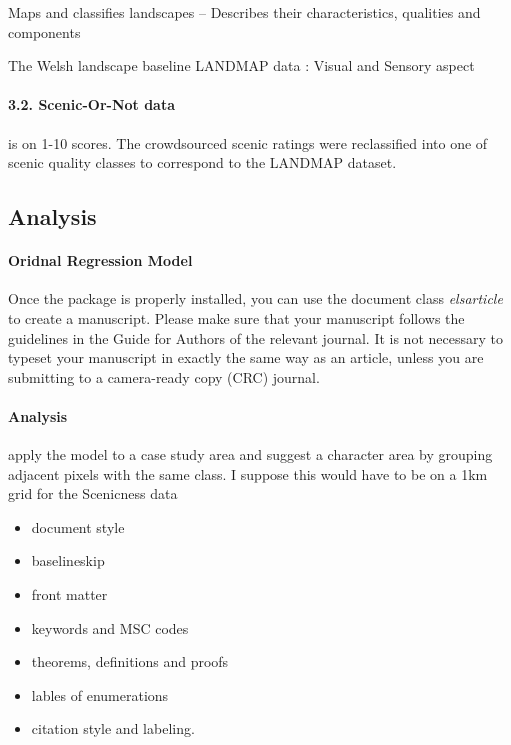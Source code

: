\documentclass[]{elsarticle} %
\begin{document}
Maps and classifies landscapes -- Describes their characteristics,
qualities and components

The Welsh landscape baseline LANDMAP data : Visual and Sensory aspect

\hypertarget{scenic-or-not-data}{%
\paragraph{3.2. Scenic-Or-Not data}\label{scenic-or-not-data}}

is on 1-10 scores. The crowdsourced scenic ratings were reclassified
into one of scenic quality classes to correspond to the LANDMAP dataset.

\hypertarget{analysis}{%
\subsection{Analysis}\label{analysis}}

\hypertarget{oridnal-regression-model}{%
\paragraph{Oridnal Regression Model}\label{oridnal-regression-model}}

Once the package is properly installed, you can use the document class
\emph{elsarticle} to create a manuscript. Please make sure that your
manuscript follows the guidelines in the Guide for Authors of the
relevant journal. It is not necessary to typeset your manuscript in
exactly the same way as an article, unless you are submitting to a
camera-ready copy (CRC) journal.

\hypertarget{analysis-1}{%
\paragraph{Analysis}\label{analysis-1}}

apply the model to a case study area and suggest a character area by
grouping adjacent pixels with the same class. I suppose this would have
to be on a 1km grid for the Scenicness data

\begin{itemize}
\item
  document style
\item
  baselineskip
\item
  front matter
\item
  keywords and MSC codes
\item
  theorems, definitions and proofs
\item
  lables of enumerations
\item
  citation style and labeling.
\end{itemize}
\end{document}
